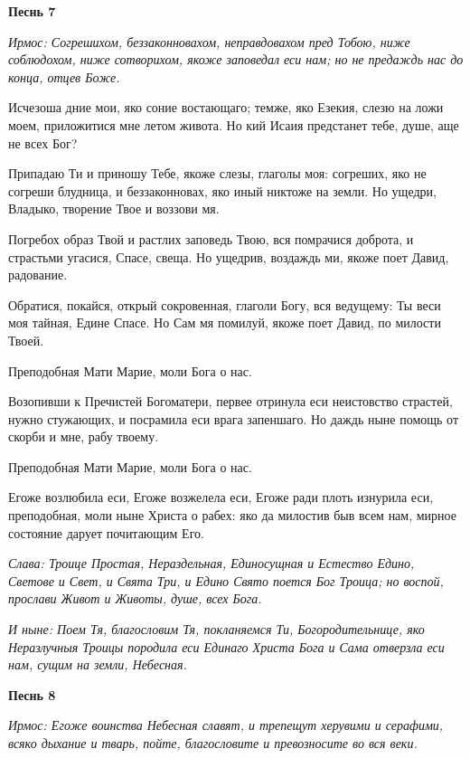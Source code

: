 \bfseries Песнь 7\normalfont{}

\itshape Ирмос\normalfont{}: Согрешихом, беззаконновахом, неправдовахом пред Тобою, ниже соблюдохом, ниже сотворихом, якоже заповедал еси нам; но не предаждь нас до конца, отцев Боже. 

Исчезоша дние мои, яко соние востающаго; темже, яко Езекия, слезю на ложи моем, приложитися мне летом живота. Но кий Исаия предстанет тебе, душе, аще не всех Бог? 

Припадаю Ти и приношу Тебе, якоже слезы, глаголы моя: согреших, яко не согреши блудница, и беззаконновах, яко иный никтоже на земли. Но ущедри, Владыко, творение Твое и воззови мя. 

Погребох образ Твой и растлих заповедь Твою, вся помрачися доброта, и страстьми угасися, Спасе, свеща. Но ущедрив, воздаждь ми, якоже поет Давид, радование. 

Обратися, покайся, открый сокровенная, глаголи Богу, вся ведущему: Ты веси моя тайная, Едине Спасе. Но Сам мя помилуй, якоже поет Давид, по милости Твоей. 

\bfseries 

Преподобная Мати Марие, моли Бога о нас.

\normalfont{}

Возопивши к Пречистей Богоматери, первее отринула еси неистовство страстей, нужно стужающих, и посрамила еси врага запеншаго. Но даждь ныне помощь от скорби и мне, рабу твоему. 

\bfseries 

Преподобная Мати Марие, моли Бога о нас.

\normalfont{}

Егоже возлюбила еси, Егоже возжелела еси, Егоже ради плоть изнурила еси, преподобная, моли ныне Христа о рабех: яко да милостив быв всем нам, мирное состояние дарует почитающим Его. 

\itshape Слава\normalfont{}: Троице Простая, Нераздельная, Единосущная и Естество Едино, Светове и Свет, и Свята Три, и Едино Свято поется Бог Троица; но воспой, прослави Живот и Животы, душе, всех Бога. 

\itshape И ныне\normalfont{}: Поем Тя, благословим Тя, покланяемся Ти, Богородительнице, яко Неразлучныя Троицы породила еси Единаго Христа Бога и Сама отверзла еси нам, сущим на земли, Небесная.


\medskip


\bfseries Песнь 8\normalfont{}

\itshape Ирмос\normalfont{}: Егоже воинства Небесная славят, и трепещут херувими и серафими, всяко дыхание и тварь, пойте, благословите и превозносите во вся веки. 

